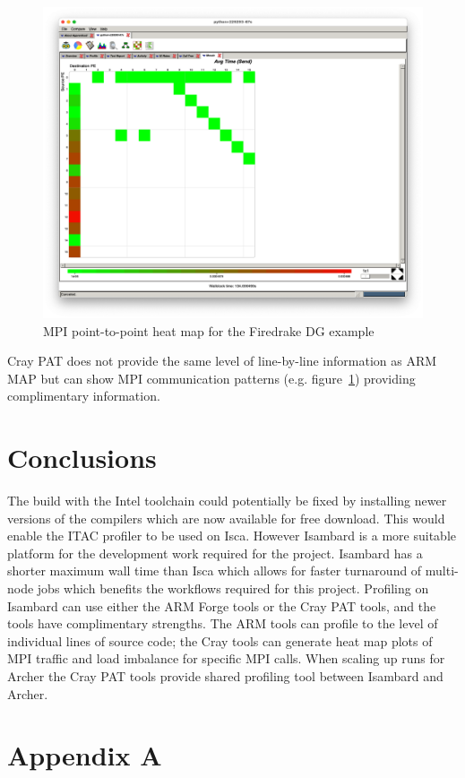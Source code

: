 \documentclass[a4paper,titlepage]{article}
\begin{document}
\begin{figure}[htbp]
\begin{center}
\includegraphics[scale=0.3]{figures/DG_PAT2}
\caption{MPI point-to-point heat map for the Firedrake DG example}
\label{fig:DG_PAT_heatmap}
\end{center}
\end{figure}
Cray PAT does not provide the same level of line-by-line information as ARM MAP but can show MPI communication patterns (e.g. figure~\ref{fig:DG_PAT_heatmap})
providing complimentary information.


\section{Conclusions}
\label{section:conclusions}

The build with the Intel toolchain could potentially be fixed by installing newer versions of the compilers which are now available for free download. This would enable the ITAC profiler to be used on Isca. However Isambard is a more suitable platform for the development work required for the project. Isambard has a shorter maximum wall time than Isca which allows for faster turnaround of multi-node jobs which benefits the workflows required for this project. Profiling on Isambard can use either the ARM Forge tools or the Cray PAT tools, and the tools have complimentary strengths. The ARM tools can profile to the level of individual lines of source code; the Cray tools can generate heat map plots of MPI traffic and load imbalance for specific MPI calls. When scaling up runs for Archer the Cray PAT tools provide shared profiling tool between Isambard and Archer. 

\pagebreak


\section*{Appendix A}
\label{appendixA}

\end{document}
